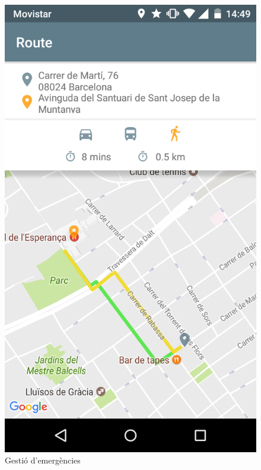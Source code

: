 \begin{itemize}
\begin{figure}[!h]
\includegraphics[scale=0.15]{Figures/hospital.png}
\caption{Gestió d'emergències}
\end{figure}

\end{itemize}


